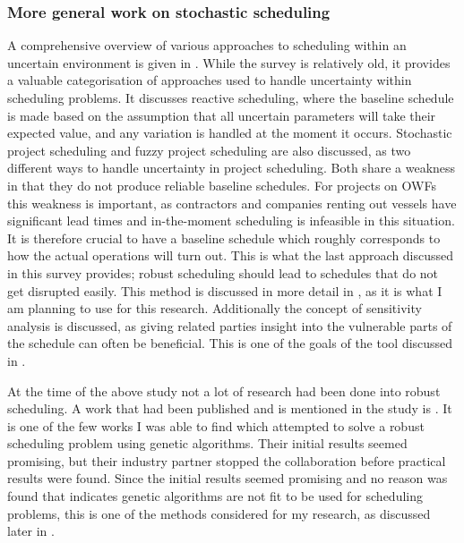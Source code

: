 \documentclass[a4paper,12pt]{article}
\begin{document}
\subsubsection{More general work on stochastic scheduling} \label{sss:stoch}
A comprehensive overview of various approaches to scheduling within an uncertain environment is given in \cite{herroelen2005project}. While the survey is relatively old, it provides a valuable categorisation of approaches used to handle uncertainty within scheduling problems. It discusses reactive scheduling, where the baseline schedule is made based on the assumption that all uncertain parameters will take their expected value, and any variation is handled at the moment it occurs. Stochastic project scheduling and fuzzy project scheduling are also discussed, as two different ways to handle uncertainty in project scheduling. Both share a weakness in that they do not produce reliable baseline schedules. For projects on OWFs this weakness is important, as contractors and companies renting out vessels have significant lead times and in-the-moment scheduling is infeasible in this situation. It is therefore crucial to have a baseline schedule which roughly corresponds to how the actual operations will turn out. This is what the last approach discussed in this survey provides; robust scheduling should lead to schedules that do not get disrupted easily. This method is discussed in more detail in , as it is what I am planning to use for this research. Additionally the concept of sensitivity analysis is discussed, as giving related parties insight into the vulnerable parts of the schedule can often be beneficial. This is one of the goals of the tool discussed in . 

At the time of the above study not a lot of research had been done into robust scheduling. A work that had been published and is mentioned in the study is \cite{sevaux2002genetic}. It is one of the few works I was able to find which attempted to solve a robust scheduling problem using genetic algorithms. Their initial results seemed promising, but their industry partner stopped the collaboration before practical results were found. Since the initial results seemed promising and no reason was found that indicates genetic algorithms are not fit to be used for scheduling problems, this is one of the methods considered for my research, as discussed later in .
\end{document}
